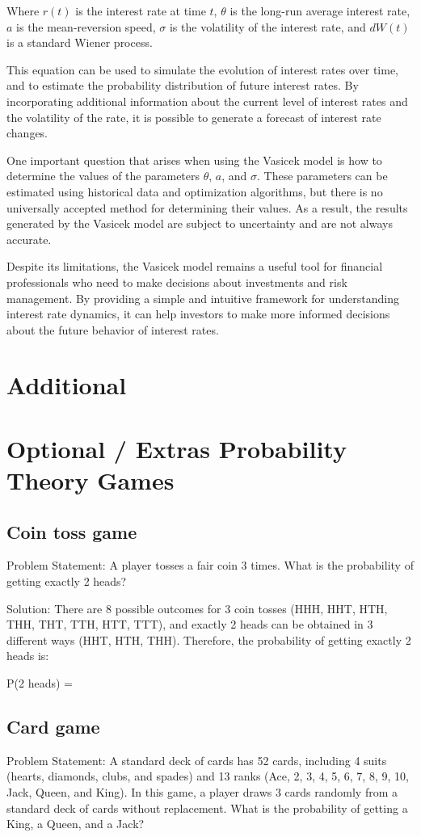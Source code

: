 \documentclass[12pt, a4paper, oneside]{article}
\begin{document}
Where $r(t)$ is the interest rate at time $t$, $\theta$ is the long-run average interest rate, $a$ is the mean-reversion speed, $\sigma$ is the volatility of the interest rate, and $dW(t)$ is a standard Wiener process.

This equation can be used to simulate the evolution of interest rates over time, and to estimate the probability distribution of future interest rates. By incorporating additional information about the current level of interest rates and the volatility of the rate, it is possible to generate a forecast of interest rate changes.

One important question that arises when using the Vasicek model is how to determine the values of the parameters $\theta$, $a$, and $\sigma$. These parameters can be estimated using historical data and optimization algorithms, but there is no universally accepted method for determining their values. As a result, the results generated by the Vasicek model are subject to uncertainty and are not always accurate.

Despite its limitations, the Vasicek model remains a useful tool for financial professionals who need to make decisions about investments and risk management. By providing a simple and intuitive framework for understanding interest rate dynamics, it can help investors to make more informed decisions about the future behavior of interest rates.


\section{Additional}
\section{Optional / Extras  Probability Theory Games  }
\subsection{ Coin toss game }
Problem Statement:
A player tosses a fair coin 3 times. What is the probability of getting exactly 2 heads?

Solution:
There are 8 possible outcomes for 3 coin tosses (HHH, HHT, HTH, THH, THT, TTH, HTT, TTT), and exactly 2 heads can be obtained in 3 different ways (HHT, HTH, THH).
Therefore, the probability of getting exactly 2 heads is:

P(2 heads) = 


\subsection{ Card game }
Problem Statement:
A standard deck of cards has 52 cards, including 4 suits (hearts, diamonds, clubs, and spades) and 13 ranks (Ace, 2, 3, 4, 5, 6, 7, 8, 9, 10, Jack, Queen, and King). In this game, a player draws 3 cards randomly from a standard deck of cards without replacement. What is the probability of getting a King, a Queen, and a Jack?
\end{document}
